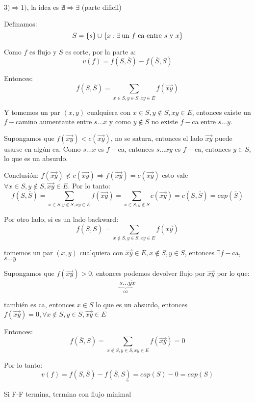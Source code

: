 \documentclass[12pt,a4paper]{article}
\begin{document}
$3) \Rightarrow 1)$, la idea es $\nexists \Rightarrow \exists$ (parte dificil)
\medskip

Definamos:
$$S = \left\lbrace s \right\rbrace \cup \left\lbrace x: \exists \, \text{un $f$ ca entre $s$ y $x$} \right\rbrace$$

Como $f$ es flujo y $S$ es corte, por la parte a:
$$v(f) = f(S,\overline{S}) - f(\overline{S},S)$$

Entonces:
$$f(S,\overline{S}) = \sum_{x\in S, y\in \overline{S}, xy \in E} f(\overrightarrow{xy})$$

Y tomemos un par $(x,y)$ cualquiera con $x\in S, y \notin S, xy \in E$, entonces 
existe un $f-$camino aumentante entre $s\ldots x$ y como $y \notin S$ no existe $f-$ca entre $s\ldots y$.
\medskip

Supongamos que $f(\overrightarrow{xy}) < c(\overrightarrow{xy})$, no se satura, 
entonces el lado $\overrightarrow{xy}$ puede usarse en algún ca. Como $s\ldots x$ 
es $f-$ca, entonces $s\ldots xy$ es $f-$ca, entonces $y \in S$, lo que es un absurdo.
\medskip

Conclusión: $f(\overrightarrow{xy}) \nless c(\overrightarrow{xy}) \Rightarrow f(\overrightarrow{xy}) = c(\overrightarrow{xy})$ 
esto vale $\forall x\in S, y\notin S, \overrightarrow{xy}\in E$. Por lo tanto:
$$f(S,\overline{S}) = \sum_{x\in S, y\notin S, xy \in E} f(\overrightarrow{xy}) = \sum_{x\in S, y\notin S}c(\overrightarrow{xy}) = c(S,\overline{S}) = cap(\overline{S})$$

Por otro lado, si es un lado backward:
$$f(\overline{S},S) = \sum_{x\notin S, y\in S, xy \in E} f(\overrightarrow{xy})$$

tomemos un par $(x,y)$ cualquiera con $\overrightarrow{xy} \in E, x\notin S, y\in S$, 
entonces $\exists f-$ca, $s\ldots y$
\medskip

Supongamos que $f(\overrightarrow{xy}) > 0$, entonces podemos devolver flujo por 
$\overrightarrow{xy}$ por lo que:
$$\underbrace{s\ldots y}_{ca}\overleftarrow{x}$$ 

también es ca, entonces $x\in S$ lo que es un absurdo, entonces $f(\overrightarrow{xy}) = 0, \forall x\notin S, y\in S, \overrightarrow{xy}\in E$
\medskip

Entonces:
$$f(\overline{S},S) = \sum_{x\notin S, y\in S, xy\in E} f(\overrightarrow{xy}) = 0$$

Por lo tanto:
$$v(f) = f(S,\overline{S}) - f(\overline{S},S) = cap(S) - 0 = cap(S)$$
$$\square$$


\begin{corolario} Si F-F termina, termina con flujo minimal
\end{corolario}
\end{document}
